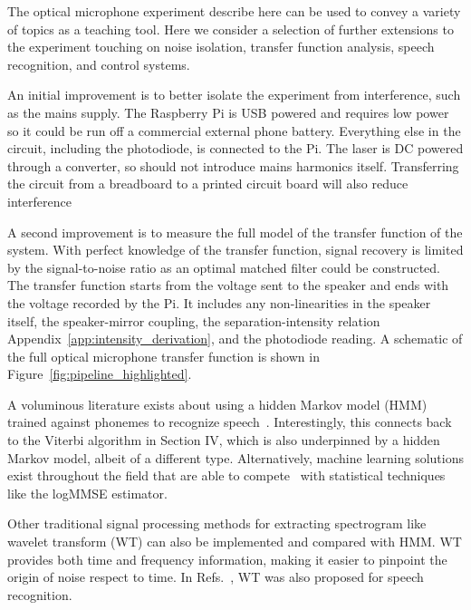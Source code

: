 \documentclass[paper-main.tex]{subfiles}
\begin{document}

The optical microphone experiment describe here can be used to convey a variety of topics as a teaching tool. 
Here we consider a selection of further extensions to the experiment touching on noise isolation, transfer function analysis, speech recognition, and control systems. 


An initial improvement is to better isolate the experiment from interference, such as the mains supply. 
The Raspberry Pi is USB powered and requires low power so it could be run off a commercial external phone battery. 
Everything else in the circuit, including the photodiode, is connected to the Pi. 
The laser is DC powered through a converter, so should not introduce mains harmonics itself. 
Transferring the circuit from a breadboard to a printed circuit board will also reduce interference~\cite{elfekey2013design}


A second improvement is to measure the full model of the transfer function of the system. 
With perfect knowledge of the transfer function, signal recovery is limited by the signal-to-noise ratio as an optimal matched filter could be constructed.
The transfer function starts from the voltage sent to the speaker and ends with the voltage recorded by the Pi. It includes any non-linearities in the speaker itself, the speaker-mirror coupling, the separation-intensity relation Appendix~\ref{app:intensity_derivation}, and the photodiode reading. 
A schematic of the full optical microphone transfer function is shown in Figure~\ref{fig:pipeline_highlighted}.

A voluminous literature exists about using a hidden Markov model (HMM) trained against phonemes to recognize speech~\cite{HMM_english}. 
Interestingly, this connects back to the Viterbi algorithm in Section IV, which is also underpinned by a hidden Markov model, albeit of a different type. 
Alternatively, machine learning solutions exist throughout the field that are able to compete~\cite{SEGAN} with statistical techniques like the logMMSE estimator.

Other traditional signal processing methods for extracting spectrogram like wavelet transform (WT) \citep{nason1995stationary} can also be implemented and compared with HMM. WT provides both time and frequency information, making it easier to pinpoint the origin of noise respect to time. 
In Refs.~\cite{tufekci2000feature,agbinya1996discrete}, WT was also proposed for speech recognition. 
\end{document}

